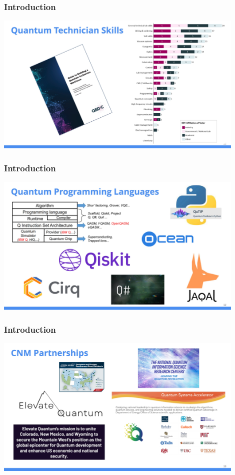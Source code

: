 \documentclass{beamer}
\begin{document}
\begin{frame}\frametitle{Introduction}
\begin{center}
\includegraphics[width=12cm]{fig/Slide11.jpeg}
\end{center}
\end{frame}



\begin{frame}\frametitle{Introduction}
\begin{center}
\includegraphics[width=12cm]{fig/Slide12.jpeg}
\end{center}
\end{frame}

\begin{frame}\frametitle{Introduction}
\begin{center}
\includegraphics[width=12cm]{fig/Slide13.jpeg}
\end{center}
\end{frame}
\end{document}
